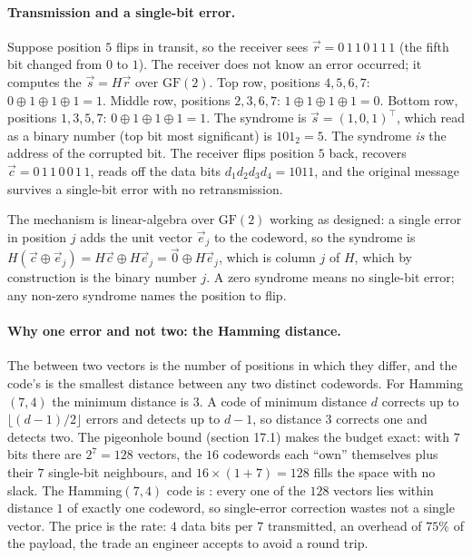 \paragraph{Transmission and a single-bit error.}
Suppose position $5$ flips in transit, so the receiver sees
$\vec{r} = 0\,1\,1\,0\,1\,1\,1$ (the fifth bit changed from $0$ to
$1$). The receiver does not know an error occurred; it computes the
 $\vec{s} = H \vec{r}$ over $\mathrm{GF}(2)$. Top
row, positions $4,5,6,7$: $0 \oplus 1 \oplus 1 \oplus 1 = 1$. Middle
row, positions $2,3,6,7$: $1 \oplus 1 \oplus 1 \oplus 1 = 0$. Bottom
row, positions $1,3,5,7$: $0 \oplus 1 \oplus 1 \oplus 1 = 1$. The
syndrome is $\vec{s} = (1, 0, 1)^{\!\top}$, which read as a binary
number (top bit most significant) is $101_{2} = 5$. The syndrome
\emph{is} the address of the corrupted bit. The receiver flips
position $5$ back, recovers $\vec{c} = 0\,1\,1\,0\,0\,1\,1$, reads
off the data bits $d_{1} d_{2} d_{3} d_{4} = 1011$, and the original
message survives a single-bit error with no retransmission.

The mechanism is linear-algebra over $\mathrm{GF}(2)$ working as
designed: a single error in position $j$ adds the unit vector
$\vec{e}_{j}$ to the codeword, so the syndrome is $H(\vec{c} \oplus
\vec{e}_{j}) = H\vec{c} \oplus H\vec{e}_{j} = \vec{0} \oplus H
\vec{e}_{j}$, which is column $j$ of $H$, which by construction is
the binary number $j$. A zero syndrome means no single-bit error;
any non-zero syndrome names the position to flip.

\paragraph{Why one error and not two: the Hamming distance.}
The  between two vectors is the number of
positions in which they differ, and the code's
 is the smallest distance between any two
distinct codewords. For Hamming$(7, 4)$ the minimum distance is $3$.
A code of minimum distance $d$ corrects up to $\lfloor (d - 1)/2
\rfloor$ errors and detects up to $d - 1$, so distance $3$ corrects
one and detects two. The pigeonhole bound (section 17.1) makes the
budget exact: with $7$ bits there are $2^{7} = 128$ vectors, the
$16$ codewords each ``own'' themselves plus their $7$ single-bit
neighbours, and $16 \times (1 + 7) = 128$ fills the space with no
slack. The Hamming$(7, 4)$ code is : every one of
the $128$ vectors lies within distance $1$ of exactly one codeword,
so single-error correction wastes not a single vector. The price is
the rate: $4$ data bits per $7$ transmitted, an overhead of $75\%$
of the payload, the trade an engineer accepts to avoid a round trip.

